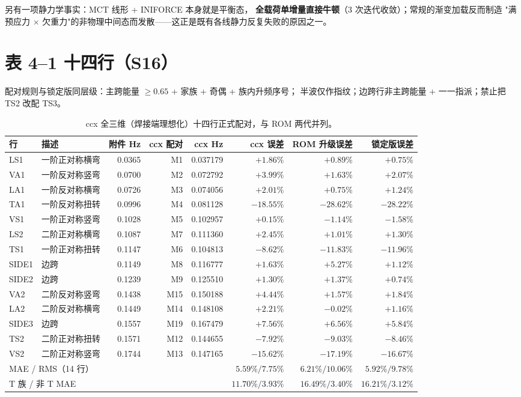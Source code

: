 \documentclass[11pt,a4paper]{ctexart}
\begin{document}
另有一项静力学事实：MCT 线形 + INIFORCE 本身就是平衡态，
\textbf{全载荷单增量直接牛顿}（3 次迭代收敛）；常规的渐变加载反而制造
"满预应力 $\times$ 欠重力"的非物理中间态而发散——这正是既有各线静力反复失败的原因之一。

\section{表 4--1 十四行（S16）}

配对规则与锁定版同层级：主跨能量 $\ge0.65$ + 家族 + 奇偶 + 族内升频序号；
半波仅作指纹；边跨行非主跨能量 + 一一指派；禁止把 TS2 改配 TS3。

\begin{table}[h]\centering\footnotesize
\begin{tabular}{llrrrrrr}
\toprule
行 & 描述 & 附件 Hz & ccx 配对 & ccx Hz & ccx 误差 & ROM 升级误差 & 锁定版误差 \\
\midrule
LS1 & 一阶正对称横弯 & 0.0365 & M1 & 0.037179 & $+1.86\%$ & $+0.89\%$ & $+0.75\%$ \\
VA1 & 一阶反对称竖弯 & 0.0700 & M2 & 0.072792 & $+3.99\%$ & $+1.63\%$ & $+2.07\%$ \\
LA1 & 一阶反对称横弯 & 0.0726 & M3 & 0.074056 & $+2.01\%$ & $+0.75\%$ & $+1.24\%$ \\
TA1 & 一阶反对称扭转 & 0.0996 & M4 & 0.081128 & $\bm{-18.55\%}$ & $-28.62\%$ & $-28.22\%$ \\
VS1 & 一阶正对称竖弯 & 0.1028 & M5 & 0.102957 & $+0.15\%$ & $-1.14\%$ & $-1.58\%$ \\
LS2 & 二阶正对称横弯 & 0.1087 & M7 & 0.111360 & $+2.45\%$ & $+1.01\%$ & $+1.30\%$ \\
TS1 & 一阶正对称扭转 & 0.1147 & M6 & 0.104813 & $\bm{-8.62\%}$ & $-11.83\%$ & $-11.96\%$ \\
SIDE1 & 边跨 & 0.1149 & M8 & 0.116777 & $+1.63\%$ & $+5.27\%$ & $+1.12\%$ \\
SIDE2 & 边跨 & 0.1239 & M9 & 0.125510 & $+1.30\%$ & $+1.37\%$ & $+0.74\%$ \\
VA2 & 二阶反对称竖弯 & 0.1438 & M15 & 0.150188 & $+4.44\%$ & $+1.57\%$ & $+1.84\%$ \\
LA2 & 二阶反对称横弯 & 0.1449 & M14 & 0.148108 & $+2.21\%$ & $-0.02\%$ & $+1.16\%$ \\
SIDE3 & 边跨 & 0.1557 & M19 & 0.167479 & $+7.56\%$ & $+6.56\%$ & $+5.84\%$ \\
TS2 & 二阶正对称扭转 & 0.1571 & M12 & 0.144655 & $\bm{-7.92\%}$ & $-9.03\%$ & $-8.46\%$ \\
VS2 & 二阶正对称竖弯 & 0.1744 & M13 & 0.147165 & $-15.62\%$ & $-17.19\%$ & $-16.67\%$ \\
\midrule
\multicolumn{5}{l}{MAE / RMS（14 行）} & $5.59\%/7.75\%$ & $6.21\%/10.06\%$ & $5.92\%/9.78\%$ \\
\multicolumn{5}{l}{T 族 / 非 T MAE} & $\bm{11.70\%}/3.93\%$ & $16.49\%/3.40\%$ & $16.21\%/3.12\%$ \\
\bottomrule
\end{tabular}
\caption{ccx 全三维（焊接端理想化）十四行正式配对，与 ROM 两代并列。}
\end{table}
\end{document}
